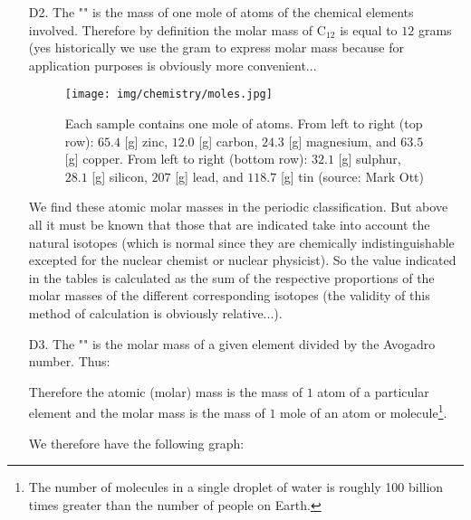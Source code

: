 \begin{enumerate}
		\item[D2.] The "\label{molar mass}" is the mass of one mole of atoms of the chemical elements involved. Therefore by definition the molar mass of $\mathrm{C}_{12}$ is equal to $12$ grams (yes historically we use the gram to express molar mass because for application purposes is obviously more convenient...
		\begin{figure}[H]
			\centering
			\texttt{[image: img/chemistry/moles.jpg]}
			\caption[]{Each sample contains one mole of atoms. From left to right (top row): $65.4$ [g] zinc, $12.0$ [g] carbon, $24.3$ [g] magnesium, and $63.5$ [g] copper. From left to right (bottom row): $32.1$ [g] sulphur, $28.1$ [g] silicon, $207$ [g] lead, and $118.7$ [g] tin (source: Mark Ott)}
		\end{figure}
		\begin{tcolorbox}[title=Remark,arc=10pt,breakable,drop lifted shadow,
  skin=enhanced,
  skin first is subskin of={enhancedfirst}{arc=10pt,no shadow},
  skin middle is subskin of={enhancedmiddle}{arc=10pt,no shadow},
  skin last is subskin of={enhancedlast}{drop lifted shadow}]
		We find these atomic molar masses in the periodic classification. But above all it must be known that those that are indicated take into account the natural isotopes (which is normal since they are chemically indistinguishable excepted for the nuclear chemist or nuclear physicist). So the value indicated in the tables is calculated as the sum of the respective proportions of the molar masses of the different corresponding isotopes (the validity of this method of calculation is obviously relative...).
		\end{tcolorbox}	
		
		\item[D3.] The "" is the molar mass of a given element divided by the Avogadro number. Thus:
		
		Therefore the atomic (molar) mass is the mass of $1$ atom of a particular element and the molar mass is the mass of $1$ mole of an atom or molecule\footnote{The number of molecules in a single droplet of water is roughly 100 billion times greater than the number of people on Earth.}.
		
		We therefore have the following graph:
		\begin{figure}[H]
			\centering
			\begin{tikzpicture}[x=0.75pt,y=0.75pt,yscale=-1,xscale=1]
			

\end{tikzpicture}
\end{figure}
\end{enumerate}
